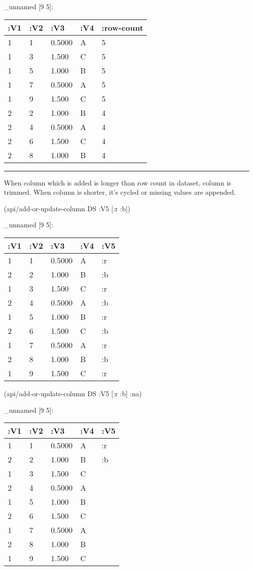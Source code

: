 \documentclass[]{article}
\newenvironment{Shaded}{\begin{snugshade}}{\end{snugshade}}
\newcommand{\AttributeTok}[1]{\textcolor[rgb]{0.77,0.63,0.00}{#1}}
\newcommand{\NormalTok}[1]{#1}
\begin{document}
\_unnamed {[}9 5{]}:

\begin{longtable}[]{@{}lllll@{}}
\toprule
:V1 & :V2 & :V3 & :V4 & :row-count\tabularnewline
\midrule
\endhead
1 & 1 & 0.5000 & A & 5\tabularnewline
1 & 3 & 1.500 & C & 5\tabularnewline
1 & 5 & 1.000 & B & 5\tabularnewline
1 & 7 & 0.5000 & A & 5\tabularnewline
1 & 9 & 1.500 & C & 5\tabularnewline
2 & 2 & 1.000 & B & 4\tabularnewline
2 & 4 & 0.5000 & A & 4\tabularnewline
2 & 6 & 1.500 & C & 4\tabularnewline
2 & 8 & 1.000 & B & 4\tabularnewline
\bottomrule
\end{longtable}

\begin{center}\rule{0.5\linewidth}{0.5pt}\end{center}

When column which is added is longer than row count in dataset, column
is trimmed. When column is shorter, it's cycled or missing values are
appended.

\begin{Shaded}
\begin{Highlighting}[]
\NormalTok{(api/add-or-update-column DS }\AttributeTok{:V5}\NormalTok{ [}\AttributeTok{:r} \AttributeTok{:b}\NormalTok{])}
\end{Highlighting}
\end{Shaded}

\_unnamed {[}9 5{]}:

\begin{longtable}[]{@{}lllll@{}}
\toprule
:V1 & :V2 & :V3 & :V4 & :V5\tabularnewline
\midrule
\endhead
1 & 1 & 0.5000 & A & :r\tabularnewline
2 & 2 & 1.000 & B & :b\tabularnewline
1 & 3 & 1.500 & C & :r\tabularnewline
2 & 4 & 0.5000 & A & :b\tabularnewline
1 & 5 & 1.000 & B & :r\tabularnewline
2 & 6 & 1.500 & C & :b\tabularnewline
1 & 7 & 0.5000 & A & :r\tabularnewline
2 & 8 & 1.000 & B & :b\tabularnewline
1 & 9 & 1.500 & C & :r\tabularnewline
\bottomrule
\end{longtable}

\begin{Shaded}
\begin{Highlighting}[]
\NormalTok{(api/add-or-update-column DS }\AttributeTok{:V5}\NormalTok{ [}\AttributeTok{:r} \AttributeTok{:b}\NormalTok{] }\AttributeTok{:na}\NormalTok{)}
\end{Highlighting}
\end{Shaded}

\_unnamed {[}9 5{]}:

\begin{longtable}[]{@{}lllll@{}}
\toprule
:V1 & :V2 & :V3 & :V4 & :V5\tabularnewline
\midrule
\endhead
1 & 1 & 0.5000 & A & :r\tabularnewline
2 & 2 & 1.000 & B & :b\tabularnewline
1 & 3 & 1.500 & C &\tabularnewline
2 & 4 & 0.5000 & A &\tabularnewline
1 & 5 & 1.000 & B &\tabularnewline
2 & 6 & 1.500 & C &\tabularnewline
1 & 7 & 0.5000 & A &\tabularnewline
2 & 8 & 1.000 & B &\tabularnewline
1 & 9 & 1.500 & C &\tabularnewline
\bottomrule
\end{longtable}
\end{document}
